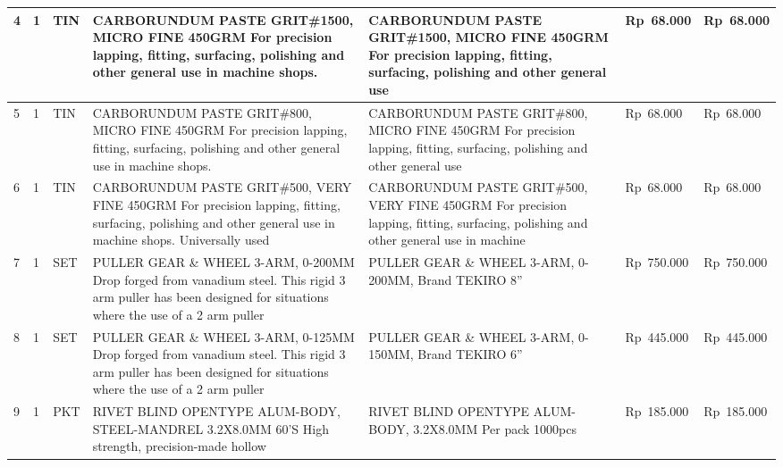 \documentclass[9pt,a4paper,landscape]{article}
\begin{document}
\begin{longtable}{|C{0.6cm}|C{0.6cm}|C{0.8cm}|L{8.0cm}|L{9.5cm}|R{2.5cm}|R{2.5cm}|}
4 & 1 & TIN &
  CARBORUNDUM PASTE GRIT\#1500, MICRO FINE\newline
  450GRM For precision lapping, fitting, surfacing,\newline
  polishing and other general use in machine shops. &
  CARBORUNDUM PASTE GRIT\#1500, MICRO FINE 450GRM\newline
  For precision lapping, fitting, surfacing, polishing and other general use &
  Rp~68.000 & Rp~68.000 \\
\hline

5 & 1 & TIN &
  CARBORUNDUM PASTE GRIT\#800, MICRO FINE\newline
  450GRM For precision lapping, fitting, surfacing,\newline
  polishing and other general use in machine shops. &
  CARBORUNDUM PASTE GRIT\#800, MICRO FINE 450GRM\newline
  For precision lapping, fitting, surfacing, polishing and other general use &
  Rp~68.000 & Rp~68.000 \\
\hline

6 & 1 & TIN &
  CARBORUNDUM PASTE GRIT\#500, VERY FINE 450GRM\newline
  For precision lapping, fitting, surfacing, polishing\newline
  and other general use in machine shops. Universally used &
  CARBORUNDUM PASTE GRIT\#500, VERY FINE 450GRM\newline
  For precision lapping, fitting, surfacing, polishing and other general use in machine &
  Rp~68.000 & Rp~68.000 \\
\hline

7 & 1 & SET &
  PULLER GEAR \& WHEEL 3-ARM, 0-200MM\newline
  Drop forged from vanadium steel. This rigid 3 arm puller\newline
  has been designed for situations where the use of a 2 arm puller &
  PULLER GEAR \& WHEEL 3-ARM, 0-200MM, Brand TEKIRO 8'' &
  Rp~750.000 & Rp~750.000 \\
\hline

8 & 1 & SET &
  PULLER GEAR \& WHEEL 3-ARM, 0-125MM\newline
  Drop forged from vanadium steel. This rigid 3 arm puller\newline
  has been designed for situations where the use of a 2 arm puller &
  PULLER GEAR \& WHEEL 3-ARM, 0-150MM, Brand TEKIRO 6'' &
  Rp~445.000 & Rp~445.000 \\
\hline

9 & 1 & PKT &
  RIVET BLIND OPENTYPE ALUM-BODY, STEEL-MANDREL\newline
  3.2X8.0MM 60'S High strength, precision-made hollow &
  RIVET BLIND OPENTYPE ALUM-BODY, 3.2X8.0MM\newline
  Per pack 1000pcs &
  Rp~185.000 & Rp~185.000 \\
\hline


\end{longtable}
\end{document}
